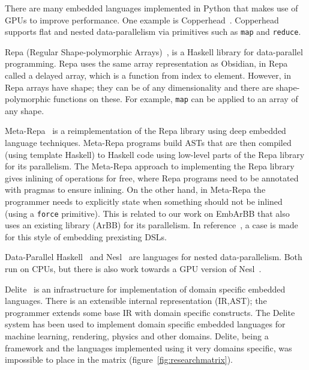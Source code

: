 \documentclass[a4paper]{book}
\begin{document}
There are many embedded languages implemented in Python that makes use of GPUs 
to improve performance. One example is Copperhead~\citet{copperhead}. Copperhead 
supports flat and nested data-parallelism via primitives such as {\tt map} and 
{\tt reduce}.  


Repa (Regular Shape-polymorphic Arrays)~\citet{REPA}, is a Haskell library for 
data-parallel programming. 
Repa uses the same array representation as Obsidian, in Repa called a delayed
array, which is a function from index to element. However, in Repa arrays have shape; 
they can be of any dimensionality and there are shape-polymorphic functions on these. 
For example, {\tt map} can be applied to an array of any shape. 

Meta-Repa~\citet{METAREPA} is a reimplementation of the Repa library using deep embedded language 
techniques. Meta-Repa programs build ASTs that are then compiled (using template 
Haskell) to Haskell code using low-level parts of the Repa library for its parallelism.
The Meta-Repa approach to implementing the Repa library 
gives inlining of operations for free, where Repa programs need to be annotated 
with pragmas to ensure inlining. On the other hand, in Meta-Repa the programmer 
needs to explicitly state when something should not be inlined (using a {\tt force} primitive).
This is related to our work on EmbArBB that also uses an existing library (ArBB) 
for its parallelism. In reference~\citet{FPCDSL}, a case is made for this style 
of embedding prexisting DSLs. 


Data-Parallel Haskell~\citet{DPH} and Nesl~\citet{NESL} are languages for 
nested data-parallelism. Both run on CPUs, but there is also work towards 
a GPU version of Nesl~\citet{NestedGPU}. 


Delite~\citet{DELITE} is an infrastructure for implementation of domain 
specific embedded languages. There is an extensible internal representation (IR,AST); 
the programmer extends some base IR with domain specific constructs. The Delite system 
has been used to implement domain specific embedded languages for machine learning, rendering, 
physics and other domains. Delite, being a framework and the languages implemented using it 
very domains specific, was impossible to place in the matrix (figure~\ref{fig:researchmatrix}). 
\end{document}
